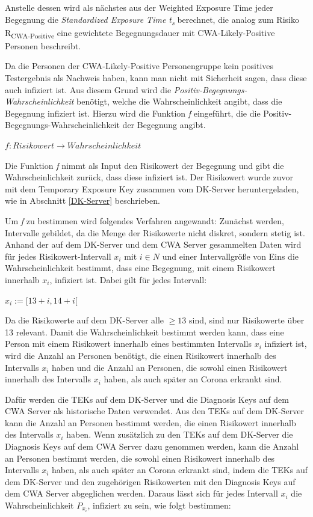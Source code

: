 \documentclass[conference,compsoc]{IEEEtran}
\begin{document}
Anstelle dessen wird als nächstes aus der Weighted Exposure Time jeder Begegnung die \textit{Standardized Exposure Time t\textsubscript{s}} berechnet,
die analog zum Risiko R\textsubscript{CWA-Positive} eine gewichtete Begegnungsdauer mit CWA-Likely-Positive Personen beschreibt.

Da die Personen der CWA-Likely-Positive Personengruppe kein positives Testergebnis als Nachweis haben, 
kann man nicht mit Sicherheit sagen, dass diese auch infiziert ist. 
Aus diesem Grund wird die \textit{Positiv-Begegnungs-Wahrscheinlichkeit} benötigt, welche die Wahrscheinlichkeit angibt, dass die Begegnung infiziert ist. 
Hierzu wird die Funktion \textit{f} eingeführt, die die Positiv-Begegnungs-Wahrscheinlichkeit der Begegnung angibt.

\centerline{\text{ }}
\centerline{$f: Risikowert \rightarrow Wahrscheinlichkeit$}
\centerline{\text{ }}

Die Funktion \textit{f} nimmt als Input den Risikowert der Begegnung und gibt die Wahrscheinlichkeit zurück, dass diese infiziert ist.
Der Risikowert wurde zuvor mit dem Temporary Exposure Key zusammen vom DK-Server heruntergeladen, wie in Abschnitt \ref{DK-Server} beschrieben.

Um \textit{f} zu bestimmen wird folgendes Verfahren angewandt:
Zunächst werden, Intervalle gebildet, da die Menge der Risikowerte nicht diskret, sondern stetig ist.
Anhand der auf dem DK-Server und dem CWA Server gesammelten Daten wird für jedes Risikowert-Intervall 
$x_i$ mit $i \in N$ und einer Intervallgröße von Eins die Wahrscheinlichkeit bestimmt, 
dass eine Begegnung, mit einem Risikowert innerhalb $x_i$, infiziert ist. 
Dabei gilt für jedes Intervall:

\centerline{\text{ }}
\centerline{$x_i := [13+i, 14+i[$}
\centerline{\text{ }}


Da die Risikowerte auf dem DK-Server alle $\geq 13$ sind, sind nur Risikowerte über 13 relevant.
Damit die Wahrscheinlichkeit bestimmt werden kann, dass eine Person mit einem Risikowert innerhalb eines bestimmten Intervalls $x_i$ infiziert ist, 
wird die Anzahl an Personen benötigt, die einen Risikowert innerhalb des Intervalls $x_i$ haben und die Anzahl an Personen, 
die sowohl einen Risikowert innerhalb des Intervalls $x_i$ haben, als auch später an Corona erkrankt sind. 

Dafür werden die TEKs auf dem DK-Server und die Diagnosis Keys auf dem CWA Server als historische Daten verwendet.
Aus den TEKs auf dem DK-Server kann die Anzahl an Personen bestimmt werden, die einen Risikowert innerhalb des Intervalls $x_i$ haben.
Wenn zusätzlich zu den TEKs auf dem DK-Server die Diagnosis Keys auf dem CWA Server dazu genommen werden, 
kann die Anzahl an Personen bestimmt werden, die sowohl einen Risikowert innerhalb des Intervalls $x_i$ haben, als auch später an Corona erkrankt sind, 
indem die TEKs auf dem DK-Server und den zugehörigen Risikowerten mit den Diagnosis Keys auf dem CWA Server abgeglichen werden. 
Daraus lässt sich für jedes Intervall $x_i$ die Wahrscheinlichkeit $P_{x_i}$, infiziert zu sein, wie folgt bestimmen:
\end{document}

